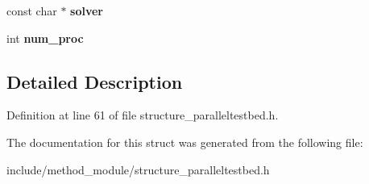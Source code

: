 \begin{DoxyCompactItemize}
\item 
\hypertarget{structexperiment__method__DE_a6ec89f3d44af3f209598e69ecbed6b8f}{const char $\ast$ {\bfseries solver}}\label{structexperiment__method__DE_a6ec89f3d44af3f209598e69ecbed6b8f}

\item 
\hypertarget{structexperiment__method__DE_aff8b413519761d46d42bdf1419c844e8}{int {\bfseries num\-\_\-proc}}\label{structexperiment__method__DE_aff8b413519761d46d42bdf1419c844e8}

\end{DoxyCompactItemize}


\subsection{Detailed Description}


Definition at line 61 of file structure\-\_\-paralleltestbed.\-h.



The documentation for this struct was generated from the following file\-:\begin{DoxyCompactItemize}
\item 
include/method\-\_\-module/structure\-\_\-paralleltestbed.\-h\end{DoxyCompactItemize}
